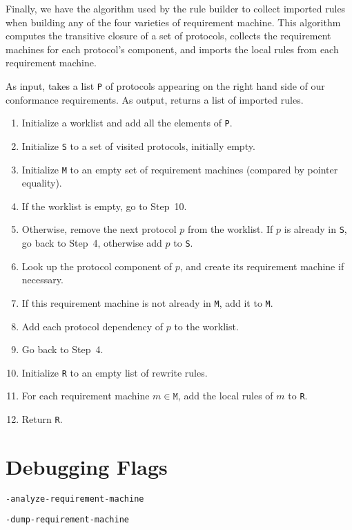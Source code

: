 \documentclass[../generics]{subfiles}
\begin{document}
%
%
Finally, we have the algorithm used by the rule builder to collect imported rules when building any of the four varieties of requirement machine. This algorithm computes the transitive closure of a set of protocols, collects the requirement machines for each protocol's component, and imports the local rules from each requirement machine.
\begin{algorithm}\label{importing rules}
As input, takes a list \texttt{P} of protocols appearing on the right hand side of our conformance requirements. As output, returns a list of imported rules.
\begin{enumerate}
\item Initialize a worklist and add all the elements of \texttt{P}.
\item Initialize \texttt{S} to a set of visited protocols, initially empty.
\item Initialize \texttt{M} to an empty set of requirement machines (compared by pointer equality).
\item If the worklist is empty, go to Step~10.
\item Otherwise, remove the next protocol $p$ from the worklist. If $p$ is already in \texttt{S}, go back to Step~4, otherwise add $p$ to \texttt{S}.
\item Look up the protocol component of $p$, and create its requirement machine if necessary.
\item If this requirement machine is not already in \texttt{M}, add it to \texttt{M}.
\item Add each protocol dependency of $p$ to the worklist.
\item Go back to Step~4.
\item Initialize \texttt{R} to an empty list of rewrite rules.
\item For each requirement machine $m\in\texttt{M}$, add the local rules of $m$ to \texttt{R}.
\item Return \texttt{R}.
\end{enumerate}
\end{algorithm}

\section{Debugging Flags}

\texttt{-analyze-requirement-machine}

\texttt{-dump-requirement-machine}
\end{document}
